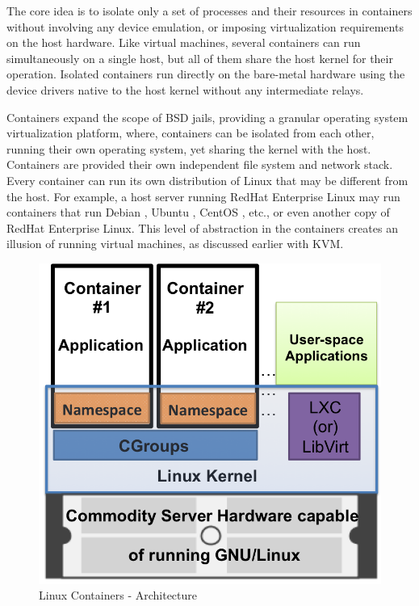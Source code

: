 The core idea is to isolate only a set of processes and their resources in containers without involving any device emulation, or imposing virtualization requirements on the host hardware. Like virtual machines, several containers can run simultaneously on a single host, but all of them share the host kernel for their operation. Isolated containers run directly on the bare-metal hardware using the device drivers native to the host kernel without any intermediate relays. 


Containers expand the scope of BSD jails, providing a granular operating system virtualization platform, where, containers can be isolated from each other, running their own operating system, yet sharing the kernel with the host. Containers are provided their own independent file system and network stack. Every container can run its own distribution of Linux that may be different from the host. For example, a host server running RedHat Enterprise Linux \cite{rhel} may run containers that run Debian \cite{debian}, Ubuntu \cite{ubuntu}, CentOS \cite{centos}, etc., or even another copy of RedHat Enterprise Linux. This level of abstraction in the containers creates an illusion of running virtual machines, as discussed earlier with KVM.  

\begin{figure}[htbp]
\centering
\includegraphics[width=130mm]{lxc-arch.png}
\caption{Linux Containers - Architecture}
\label{img_lxc_arch}
\end{figure}

